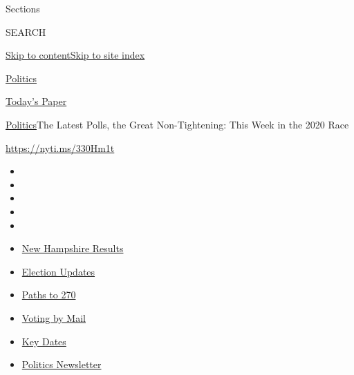 Sections

SEARCH

\protect\hyperlink{site-content}{Skip to
content}\protect\hyperlink{site-index}{Skip to site index}

\href{https://www.nytimes3xbfgragh.onion/section/politics}{Politics}

\href{https://myaccount.nytimes3xbfgragh.onion/auth/login?response_type=cookie\&client_id=vi}{}

\href{https://www.nytimes3xbfgragh.onion/section/todayspaper}{Today's
Paper}

\href{/section/politics}{Politics}\textbar{}The Latest Polls, the Great
Non-Tightening: This Week in the 2020 Race

\url{https://nyti.ms/330Hm1t}

\begin{itemize}
\item
\item
\item
\item
\item
\end{itemize}

\begin{itemize}
\item
  \href{https://www.nytimes3xbfgragh.onion/interactive/2020/09/08/us/elections/results-new-hampshire-primary-elections.html?action=click\&pgtype=Article\&state=default\&region=TOP_BANNER\&context=storylines_menu}{New
  Hampshire Results}
\item
  \href{https://www.nytimes3xbfgragh.onion/live/2020/09/08/us/trump-vs-biden?action=click\&pgtype=Article\&state=default\&region=TOP_BANNER\&context=storylines_menu}{Election
  Updates}
\item
  \href{https://www.nytimes3xbfgragh.onion/interactive/2020/us/elections/election-states-biden-trump.html?action=click\&pgtype=Article\&state=default\&region=TOP_BANNER\&context=storylines_menu}{Paths
  to 270}
\item
  \href{https://www.nytimes3xbfgragh.onion/interactive/2020/08/31/us/politics/vote-by-mail-deadlines.html?action=click\&pgtype=Article\&state=default\&region=TOP_BANNER\&context=storylines_menu}{Voting
  by Mail}
\item
  \href{https://www.nytimes3xbfgragh.onion/interactive/2019/us/elections/2020-presidential-election-calendar.html?action=click\&pgtype=Article\&state=default\&region=TOP_BANNER\&context=storylines_menu}{Key
  Dates}
\item
  \href{https://www.nytimes3xbfgragh.onion/newsletters/politics?action=click\&pgtype=Article\&state=default\&region=TOP_BANNER\&context=storylines_menu}{Politics
  Newsletter}
\end{itemize}

